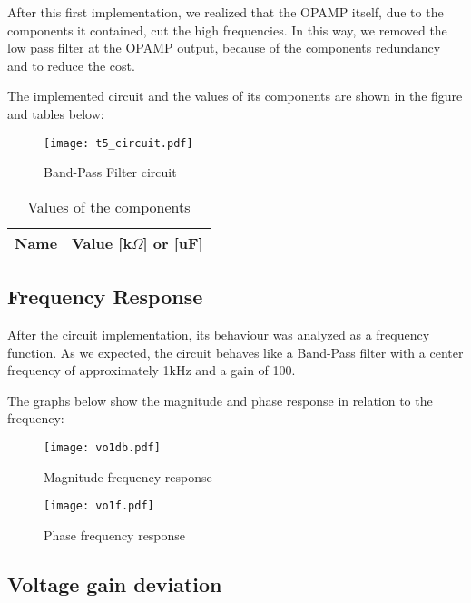 After this first implementation, we realized that the OPAMP itself, due to the components it contained, cut the high frequencies. In this way, we removed the low pass filter at the OPAMP output, because of the components redundancy and to reduce the cost.


The implemented circuit and the values of its components are shown in the figure and tables below:

\begin{figure}[H] \centering
\texttt{[image: t5\_circuit.pdf]}
\caption{Band-Pass Filter circuit}
\label{fig:t5}
\end{figure}

\begin{table}[H]
  \centering
  \begin{tabular}{|l|r|}
    \hline    
    {\bf Name} & {\bf Value [k$\Omega$] or [uF]} \\ \hline
    
  \end{tabular}
  \caption{Values of the components}
  \label{tab:www}
\end{table}
\vspace{-0.2in}

\subsection{Frequency Response}

After the circuit implementation, its behaviour was analyzed as a frequency function. As we expected, the circuit behaves like a Band-Pass filter with a center frequency of approximately 1kHz and a gain of 100. 

The graphs below show the magnitude and phase response in relation to the frequency:



\begin{figure}[H] \centering
\texttt{[image: vo1db.pdf]}
\caption{Magnitude frequency response}
\label{fig:t511}
\end{figure}

\vspace{-0.8in}



\begin{figure}[H] \centering
\texttt{[image: vo1f.pdf]}
\caption{Phase frequency response}
\label{fig:t52}
\end{figure}

\subsection{Voltage gain deviation}

